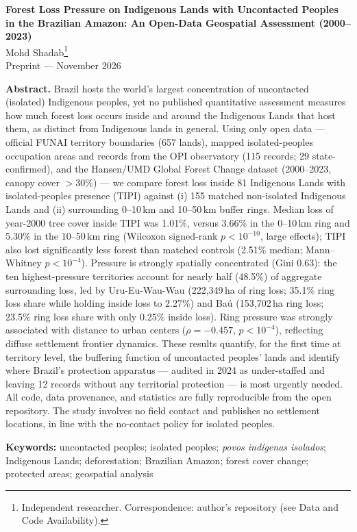 \documentclass[11pt,a4paper]{article}
\newcommand{\tipi}{TIPI}
\begin{document}
\begin{center}
    {\LARGE\bfseries Forest Loss Pressure on Indigenous Lands with Uncontacted Peoples in the Brazilian Amazon: An Open-Data Geospatial Assessment (2000--2023)}\\[10pt]
    {\normalsize Mohd Shadab\thanks{Independent researcher. Correspondence: author's repository (see Data and Code Availability).}}\\[6pt]
    {\small Preprint --- November 2026}
\end{center}

\vspace{6pt}
\begin{center}
\begin{minipage}{0.88\textwidth}
\small
\textbf{Abstract.}
Brazil hosts the world's largest concentration of uncontacted (isolated) Indigenous peoples, yet no published quantitative assessment measures how much forest loss occurs inside and around the Indigenous Lands that host them, as distinct from Indigenous lands in general. Using only open data --- official FUNAI territory boundaries (657 lands), mapped isolated-peoples occupation areas and records from the OPI observatory (115 records; 29 state-confirmed), and the Hansen/UMD Global Forest Change dataset (2000--2023, canopy cover $>$30\%) --- we compare forest loss inside 81 Indigenous Lands with isolated-peoples presence (\tipi{}) against (i) 155 matched non-isolated Indigenous Lands and (ii) surrounding 0--10\,km and 10--50\,km buffer rings. Median loss of year-2000 tree cover inside \tipi{} was 1.01\%, versus 3.66\% in the 0--10\,km ring and 5.30\% in the 10--50\,km ring (Wilcoxon signed-rank $p<10^{-10}$, large effects); \tipi{} also lost significantly less forest than matched controls (2.51\% median; Mann--Whitney $p<10^{-4}$). Pressure is strongly spatially concentrated (Gini 0.63): the ten highest-pressure territories account for nearly half (48.5\%) of aggregate surrounding loss, led by Uru-Eu-Wau-Wau (222{,}349\,ha of ring loss; 35.1\% ring loss share while holding inside loss to 2.27\%) and Ba\'u (153{,}702\,ha ring loss; 23.5\% ring loss share with only 0.25\% inside loss). Ring pressure was strongly associated with distance to urban centers ($\rho=-0.457$, $p<10^{-4}$), reflecting diffuse settlement frontier dynamics. These results quantify, for the first time at territory level, the buffering function of uncontacted peoples' lands and identify where Brazil's protection apparatus --- audited in 2024 as under-staffed and leaving 12 records without any territorial protection --- is most urgently needed. All code, data provenance, and statistics are fully reproducible from the open repository. The study involves no field contact and publishes no settlement locations, in line with the no-contact policy for isolated peoples.
\vspace{4pt}

\textbf{Keywords:} uncontacted peoples; isolated peoples; \textit{povos ind\'igenas isolados}; Indigenous Lands; deforestation; Brazilian Amazon; forest cover change; protected areas; geospatial analysis
\end{minipage}
\end{center}







\end{document}
